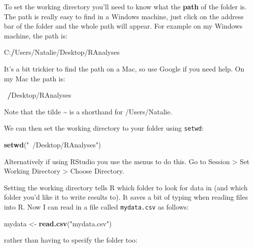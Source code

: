 \documentclass[]{book}
\newenvironment{Shaded}{\begin{snugshade}}{\end{snugshade}}
\newcommand{\KeywordTok}[1]{\textcolor[rgb]{0.13,0.29,0.53}{\textbf{{#1}}}}
\newcommand{\StringTok}[1]{\textcolor[rgb]{0.31,0.60,0.02}{{#1}}}
\newcommand{\ErrorTok}[1]{\textcolor[rgb]{0.64,0.00,0.00}{\textbf{{#1}}}}
\newcommand{\NormalTok}[1]{{#1}}
\begin{document}
To set the working directory you'll need to know what the \textbf{path}
of the folder is. The path is really easy to find in a Windows machine,
just click on the address bar of the folder and the whole path will
appear. For example on my Windows machine, the path is:

\begin{Shaded}
\begin{Highlighting}[]
\NormalTok{C:}\ErrorTok{/}\NormalTok{Users/Natalie/Desktop/RAnalyses}
\end{Highlighting}
\end{Shaded}

It's a bit trickier to find the path on a Mac, so use Google if you need
help. On my Mac the path is:

\begin{Shaded}
\begin{Highlighting}[]
\NormalTok{~}\ErrorTok{/}\NormalTok{Desktop/RAnalyses}
\end{Highlighting}
\end{Shaded}

Note that the tilde \textasciitilde{} is a shorthand for /Users/Natalie.

We can then set the working directory to your folder using
\texttt{setwd}:

\begin{Shaded}
\begin{Highlighting}[]
\KeywordTok{setwd}\NormalTok{(}\StringTok{"~/Desktop/RAnalyses"}\NormalTok{)}
\end{Highlighting}
\end{Shaded}

Alternatively if using RStudio you use the menus to do this. Go to
Session \textgreater{} Set Working Directory \textgreater{} Choose
Directory.

Setting the working directory tells R which folder to look for data in
(and which folder you'd like it to write results to). It saves a bit of
typing when reading files into R. Now I can read in a file called
\texttt{mydata.csv} as follows:

\begin{Shaded}
\begin{Highlighting}[]
\NormalTok{mydata <-}\StringTok{ }\KeywordTok{read.csv}\NormalTok{(}\StringTok{"mydata.csv"}\NormalTok{)}
\end{Highlighting}
\end{Shaded}

rather than having to specify the folder too:
\end{document}
